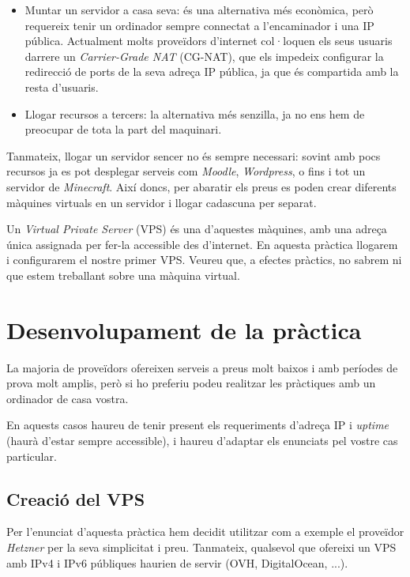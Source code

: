 \documentclass{practicaitic}
\begin{document}
\begin{itemize}
  \item Muntar un servidor a casa seva: és una alternativa més econòmica, però
  requereix tenir un ordinador sempre connectat a l'encaminador i una IP pública.
  Actualment molts proveïdors d'internet col·loquen els seus usuaris darrere un
  \textit{Carrier-Grade NAT} (CG-NAT), que els impedeix configurar la
  redirecció de ports de la seva adreça IP pública, ja que és compartida amb la
  resta d'usuaris.
  \item Llogar recursos a tercers: la alternativa més senzilla, ja no ens hem
  de preocupar de tota la part del maquinari.
\end{itemize}

Tanmateix, llogar un servidor sencer no és sempre necessari: sovint amb pocs
recursos ja es pot desplegar serveis com \textit{Moodle}, \textit{Wordpress},
o fins i tot un servidor de \textit{Minecraft}.
Així doncs, per abaratir els preus es poden crear diferents màquines virtuals
en un servidor i llogar cadascuna per separat.

Un \textit{Virtual Private Server} (VPS) és una d'aquestes màquines, amb una
adreça única assignada per fer-la accessible des d'internet. En aquesta
pràctica llogarem i configurarem el nostre primer VPS. Veureu que, a efectes pràctics,
no sabrem ni que estem treballant sobre una màquina virtual.

\section{Desenvolupament de la pràctica}

La majoria de proveïdors
ofereixen serveis a preus molt baixos i amb períodes de prova molt amplis, però
si ho preferiu podeu realitzar les pràctiques amb un ordinador de casa vostra.

En aquests casos haureu de tenir present els requeriments d'adreça IP i
\textit{uptime} (haurà d'estar sempre accessible), i haureu d'adaptar els
enunciats pel vostre cas particular.

\subsection{Creació del VPS}

Per l'enunciat d'aquesta pràctica hem decidit utilitzar com a exemple el
proveïdor \textit{Hetzner} per la seva simplicitat i preu. Tanmateix,
qualsevol que ofereixi un VPS amb IPv4 i
IPv6 públiques haurien de servir (OVH, DigitalOcean, ...).
\end{document}
